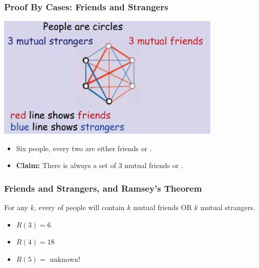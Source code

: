 \documentclass{beamer}
\begin{document}
\begin{frame}
  \frametitle{Proof By Cases: Friends and Strangers}

  \begin{center}
    \includegraphics[width=0.8\textwidth]{../img/friends_and_strangers}
  \end{center}

  \begin{itemize}
  \item Six people, every two are either \alert{friends} or .
  \item {\bf Claim:} There is always a set of \alert{3 mutual
    friends} or .
  \end{itemize}
  
\end{frame}

\begin{frame}
  \frametitle{Friends and Strangers, and Ramsey's Theorem}

  For any $k$, every  of people
  will contain $k$ mutual friends OR $k$ mutual strangers.
  
  \bigskip
  
  \begin{itemize}
  \item $R(3) = 6$
  \item $R(4) = 18$
  \item $R(5) = \text{ unknown!}$
  \end{itemize}
\end{frame}
\end{document}

